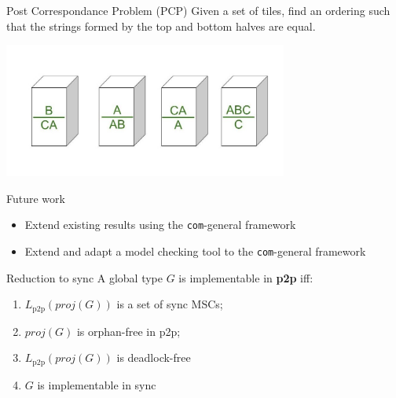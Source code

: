 \documentclass{beamer}
\begin{document}
\begin{frame}{Post Correspondance Problem (PCP)}
	Given a set of tiles, find an ordering such that the
	strings formed by the top and bottom halves are equal.

	\begin{center}
		\includegraphics[width=0.7\textwidth]{pcp.jpg}
	\end{center}

\end{frame}

\begin{frame}[fragile]{Future work}
	\begin{itemize}
		\item Extend existing results using the \verb|com|-general framework

		      \bigskip

		\item Extend and adapt a model checking tool to the \verb|com|-general framework
	\end{itemize}
\end{frame}

\begin{frame}{Reduction to sync}
	A global type $G$ is implementable in \textbf{p2p} iff:
	\begin{enumerate}
		\item $L_{\text{p2p}}(proj(G))$ is a set of sync MSCs;
		\item $proj(G)$ is orphan-free in p2p; %
		\item $L_{\text{p2p}}(proj(G))$ is deadlock-free
		\item $G$ is implementable in sync
	\end{enumerate}
\end{frame}
\end{document}
